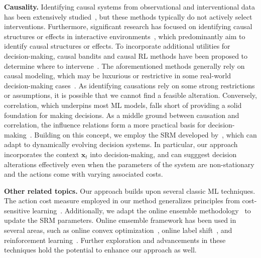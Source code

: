 \documentclass{article}
\theoremstyle{plain}
\theoremstyle{definition}
\theoremstyle{remark}
\def \x {\mathbf{x}}
\begin{document}
\textbf{Causality.} Identifying causal systems from observational and interventional data has been extensively studied~\citep{scholkopf2021toward, squires2023linear, buchholz2024learning, zhang2023identifiability, chen2024identification}, but these methods typically do not actively select interventions. Furthermore, significant research has focused on identifying causal structures or effects in interactive environments~\citep{he2008active, KocaogluDV17, wang2020cost,wang2023sound,qint2021ate, wang2023estimating, zhang2023active, qin2024tracking}, which predominantly aim to identify causal structures or effects. 
To incorporate additional utilities for decision-making, causal bandits and causal RL methods have been proposed to determine where to intervene~\citep{bareinboim2015bandits, latt2016causalbandit, sen2017identifying, LeeB20, zhang2019RL, arnound2020Corr, LuMT21}. 
The aforementioned methods generally rely on causal modeling, which may be luxurious or restrictive in some real-world decision-making cases~\citep{zhouzh2022rehearsal, qint2023srm}. As identifying causations rely on some strong restrictions or assumptions, it is possible that we cannot find a feasible alteration. 
Conversely, correlation, which underpins most ML models, falls short of providing a solid foundation for making decisions. 
As a middle ground between causation and correlation, the influence relations form a more practical basis for decision-making~\citep{zhouzh2022rehearsal}.
Building on this concept, we employ the SRM developed by~\citet{qint2023srm}, which can adapt to dynamically evolving decision systems. 
In particular, our approach incorporates the context $\x_t$ into decision-making, and can sugggest decision alterations effectively even when the parameters of the system are non-stationary and the actions come with varying associated costs.


\textbf{Other related topics.} Our approach builds upon several classic ML techniques. The action cost measure employed in our method generalizes principles from cost-sensitive learning~\citep{elkan2001foundations, zhouzh2011cost}. Additionally, we adapt the online ensemble methodology~\citep{zhao2024adaptivity} to update the SRM parameters.
Online emsemble framework has been used in several areas, such as online convex optimization~\citep{NeurIPS'23:universal}, online label shift~\citep{ICDM'23:NOLS}, and reinforcement learning~\citep{NeurIPS'23:linearMDP}. Further exploration and advancements in these techniques hold the potential to enhance our approach as well.
\end{document}
